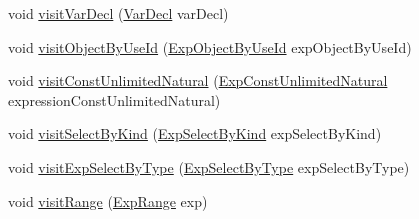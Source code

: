\begin{DoxyCompactItemize}
\item 
void \hyperlink{classorg_1_1tzi_1_1use_1_1uml_1_1ocl_1_1expr_1_1_expression_print_visitor_a63056320e40fa9923cd20b094cf0e211}{visit\-Var\-Decl} (\hyperlink{classorg_1_1tzi_1_1use_1_1uml_1_1ocl_1_1expr_1_1_var_decl}{Var\-Decl} var\-Decl)
\item 
void \hyperlink{classorg_1_1tzi_1_1use_1_1uml_1_1ocl_1_1expr_1_1_expression_print_visitor_ad7b26ed089cf4f4d224457cc84bbf2cd}{visit\-Object\-By\-Use\-Id} (\hyperlink{classorg_1_1tzi_1_1use_1_1uml_1_1ocl_1_1expr_1_1_exp_object_by_use_id}{Exp\-Object\-By\-Use\-Id} exp\-Object\-By\-Use\-Id)
\item 
void \hyperlink{classorg_1_1tzi_1_1use_1_1uml_1_1ocl_1_1expr_1_1_expression_print_visitor_adf6ac2faf818bd84795bfaf89f2972c8}{visit\-Const\-Unlimited\-Natural} (\hyperlink{classorg_1_1tzi_1_1use_1_1uml_1_1ocl_1_1expr_1_1_exp_const_unlimited_natural}{Exp\-Const\-Unlimited\-Natural} expression\-Const\-Unlimited\-Natural)
\item 
void \hyperlink{classorg_1_1tzi_1_1use_1_1uml_1_1ocl_1_1expr_1_1_expression_print_visitor_a812bb250735e0472144ab2cf0249badc}{visit\-Select\-By\-Kind} (\hyperlink{classorg_1_1tzi_1_1use_1_1uml_1_1ocl_1_1expr_1_1_exp_select_by_kind}{Exp\-Select\-By\-Kind} exp\-Select\-By\-Kind)
\item 
void \hyperlink{classorg_1_1tzi_1_1use_1_1uml_1_1ocl_1_1expr_1_1_expression_print_visitor_ac2a5b0758c190146abf1c616a8f6d1c4}{visit\-Exp\-Select\-By\-Type} (\hyperlink{classorg_1_1tzi_1_1use_1_1uml_1_1ocl_1_1expr_1_1_exp_select_by_type}{Exp\-Select\-By\-Type} exp\-Select\-By\-Type)
\item 
void \hyperlink{classorg_1_1tzi_1_1use_1_1uml_1_1ocl_1_1expr_1_1_expression_print_visitor_af691d350b42052b40da45dcc754f0289}{visit\-Range} (\hyperlink{classorg_1_1tzi_1_1use_1_1uml_1_1ocl_1_1expr_1_1_exp_range}{Exp\-Range} exp)
\end{DoxyCompactItemize}
